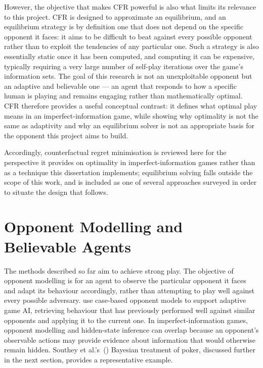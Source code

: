 \documentclass[12pt,a4paper,oneside]{report}
\begin{document}
However, the objective that makes CFR powerful is also what limits its relevance to
this project. CFR is designed to approximate an equilibrium, and an equilibrium
strategy is by definition one that does not depend on the specific opponent it
faces: it aims to be difficult to beat against every possible opponent rather than
to exploit the tendencies of any particular one. Such a strategy is also
essentially static once it has been computed, and computing it can be expensive,
typically requiring a very large number of self-play iterations over the game's
information sets. The goal of this research is not an unexploitable opponent but an
adaptive and believable one --- an agent that responds to how a specific human is
playing and remains engaging rather than mathematically optimal. CFR therefore provides a useful conceptual contrast: it defines what optimal play means in an imperfect-information game, while showing why optimality is not the same as adaptivity and why an equilibrium solver is not an appropriate basis for the opponent this project aims to build.

Accordingly, counterfactual regret minimisation is reviewed here for the
perspective it provides on optimality in imperfect-information games rather than
as a technique this dissertation implements; equilibrium solving falls outside the
scope of this work, and is included as one of several approaches surveyed in order
to situate the design that follows.




\section{Opponent Modelling and Believable Agents}
\label{sec:opponent-modelling}

The methods described so far aim to achieve strong play. The objective of opponent modelling is for an agent to observe the particular opponent it faces and adapt its behaviour accordingly, rather than attempting to play well against every possible adversary. \textcite{bakkes2009opponent} use case-based opponent models to support adaptive game AI, retrieving behaviour that has previously performed well against similar opponents and applying it to the current one. In imperfect-information games, opponent modelling and hidden-state inference can overlap because an opponent's observable actions may provide evidence about information that would otherwise remain hidden. Southey et al.'s~(\citeyear{southey2005bayes}) Bayesian treatment of poker, discussed further in the next section, provides a representative example.
\end{document}
